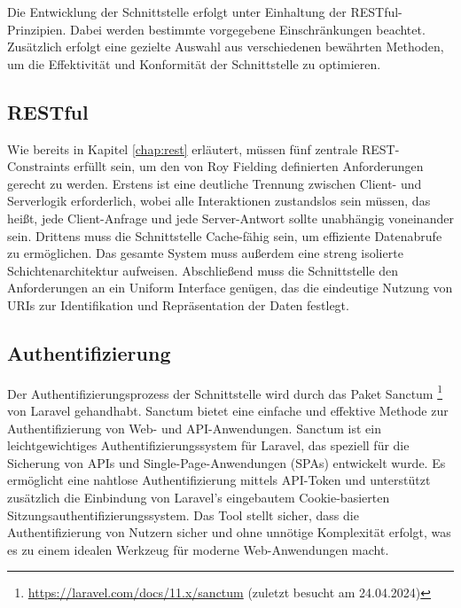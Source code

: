 \documentclass[draft,final]{vutinfth} %
\begin{document}
Die Entwicklung der Schnittstelle erfolgt unter Einhaltung der RESTful-Prinzipien. 
Dabei werden bestimmte vorgegebene Einschränkungen beachtet. 
Zusätzlich erfolgt eine gezielte Auswahl aus verschiedenen bewährten Methoden, um die Effektivität und Konformität der Schnittstelle zu optimieren.


\subsection{RESTful}

Wie bereits in Kapitel \ref{chap:rest} erläutert, müssen fünf zentrale REST-Constraints erfüllt sein, um den von Roy Fielding definierten Anforderungen gerecht zu werden. 
Erstens ist eine deutliche Trennung zwischen Client- und Serverlogik erforderlich, wobei alle Interaktionen zustandslos sein müssen, das heißt, jede Client-Anfrage und jede Server-Antwort sollte unabhängig voneinander sein. Drittens muss die Schnittstelle Cache-fähig sein, um effiziente Datenabrufe zu ermöglichen.
Das gesamte System muss außerdem eine streng isolierte Schichtenarchitektur aufweisen.
Abschließend muss die Schnittstelle den Anforderungen an ein Uniform Interface genügen, das die eindeutige Nutzung von URIs zur Identifikation und Repräsentation der Daten festlegt.


\subsection{Authentifizierung}


Der Authentifizierungsprozess der Schnittstelle wird durch das Paket Sanctum
\footnote{
	\url{https://laravel.com/docs/11.x/sanctum} (zuletzt besucht am 24.04.2024)
} 
von Laravel gehandhabt. 
Sanctum bietet eine einfache und effektive Methode zur Authentifizierung von Web- und API-Anwendungen.
Sanctum ist ein leichtgewichtiges Authentifizierungssystem für Laravel, das speziell für die Sicherung von APIs und Single-Page-Anwendungen (SPAs) entwickelt wurde. 
Es ermöglicht eine nahtlose Authentifizierung mittels API-Token und unterstützt zusätzlich die Einbindung von Laravel's eingebautem Cookie-basierten Sitzungsauthentifizierungssystem. 
Das Tool stellt sicher, dass die Authentifizierung von Nutzern sicher und ohne unnötige Komplexität erfolgt, was es zu einem idealen Werkzeug für moderne Web-Anwendungen macht. \cite{Steven:2023:Sanctum}
\end{document}
